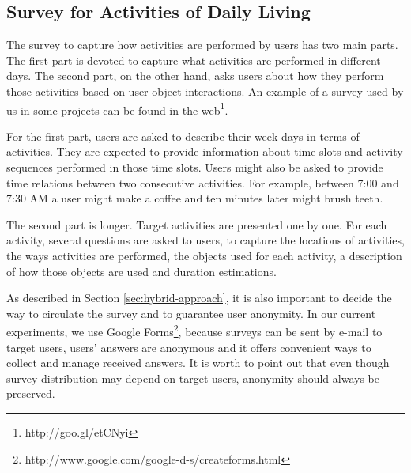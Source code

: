\subsection{Survey for Activities of Daily Living}
\begin{comment}
 - Explain each of the questions of the survey
 - Show a screenshot and provide the link to the Google Form
 - Google Forms guarantee users' anonymity
 - Explain survey-script translation criteria
\end{comment}

The survey to capture how activities are performed by users has two main parts. The first part is devoted to capture what activities are performed in different days. The second part, on the other hand, asks users about how they perform those activities based on user-object interactions. An example of a survey used by us in some projects can be found in the web\footnote{http://goo.gl/etCNyi}.

For the first part, users are asked to describe their week days in terms of activities. They are expected to provide information about time slots and activity sequences performed in those time slots. Users might also be asked to provide time relations between two consecutive activities. For example, between 7:00 and 7:30 AM a user might make a coffee and ten minutes later might brush teeth. 

The second part is longer. Target activities are presented one by one. For each activity, several questions are asked to users, to capture the locations of activities, the ways activities are performed, the objects used for each activity, a description of how those objects are used and duration estimations.

As described in Section \ref{sec:hybrid-approach}, it is also important to decide the way to circulate the survey and to guarantee user anonymity. In our current experiments, we use Google Forms\footnote{http://www.google.com/google-d-s/createforms.html}, because surveys can be sent by e-mail to target users, users' answers are anonymous and it offers convenient ways to collect and manage received answers. It is worth to point out that even though survey distribution may depend on target users, anonymity should always be preserved. 


